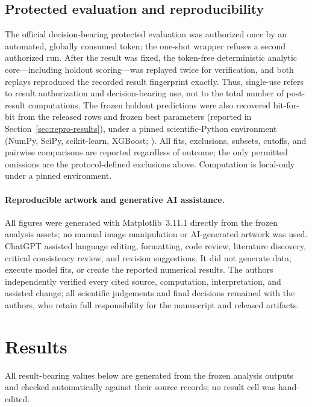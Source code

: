 \documentclass[pdflatex,sn-basic,iicol]{sn-jnl}
\begin{document}
\subsection{Protected evaluation and reproducibility}\label{sec:oneshot}

The official decision-bearing protected evaluation was authorized once by an
automated, globally consumed token; the one-shot wrapper refuses a second
authorized run. After the result was fixed, the token-free deterministic
analytic core---including holdout scoring---was replayed twice for verification,
and both replays reproduced the recorded result fingerprint exactly. Thus,
single-use refers to result authorization and decision-bearing use, not to the
total number of post-result computations. The frozen holdout predictions were
also recovered bit-for-bit from the released rows and frozen best parameters
(reported in Section~\ref{sec:repro-results}), under a pinned scientific-Python
environment (NumPy, SciPy, scikit-learn, XGBoost;
\citealp{harris2020numpy,virtanen2020scipy,pedregosa2011sklearn,chen2016xgboost}).
All fits, exclusions, subsets, cutoffs, and pairwise comparisons are reported
regardless of outcome; the only permitted omissions are the protocol-defined
exclusions above.
Computation is local-only under a pinned environment.

\paragraph{Reproducible artwork and generative AI assistance.} All figures were
generated with Matplotlib~3.11.1 directly from the frozen analysis assets; no
manual image manipulation or AI-generated artwork was used. ChatGPT assisted
language editing, formatting, code review, literature discovery, critical
consistency review, and revision suggestions. It did not generate data, execute
model fits, or create the reported numerical results. The authors independently
verified every cited source, computation, interpretation, and assisted change;
all scientific judgements and final decisions remained with the authors, who
retain full responsibility for the manuscript and released artifacts.

\section{Results}\label{sec:results}

All result-bearing values below are generated from the frozen analysis outputs
and checked automatically against their source records; no result cell was
hand-edited.
\end{document}
